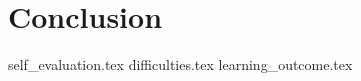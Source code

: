 \chapter{Conclusion}
\label{chap:conclusion}

{self_evaluation.tex}
{difficulties.tex}
{learning_outcome.tex}
